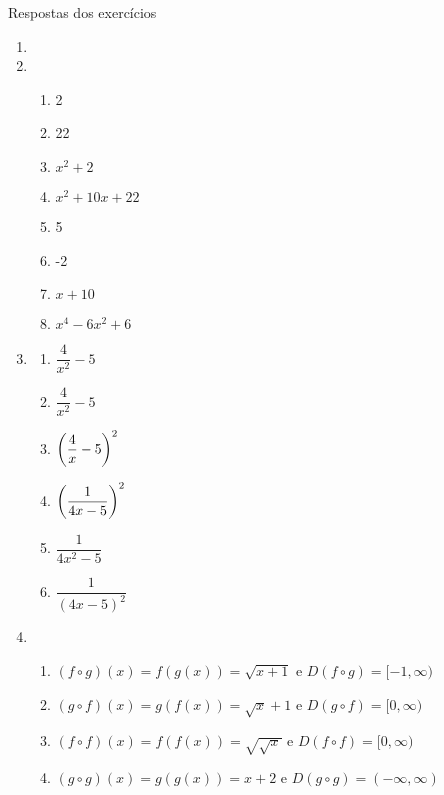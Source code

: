 \begin{frame}[allowframebreaks]{Respostas dos exercícios}
\begin{enumerate}
        \item

        \item 
        \begin{enumerate}[a]
            \item 2
            \item 22
            \item $x^2 + 2$
            \item $x^2 + 10x + 22$
            \item 5
            \item -2
            \item $x + 10$
            \item $x^4 - 6x^2 + 6$
        \end{enumerate}

        \item 
        \begin{multicols}{2}
            \begin{enumerate}[a]
                \item $\dfrac{4}{x^2} - 5$
                \item $\dfrac{4}{x^2} - 5$
                \item $\left( \dfrac{4}{x} - 5 \right)^2$
                \item $\left( \dfrac{1}{4x-5} \right)^2$
                \item $\dfrac{1}{4x^2 - 5}$
                \item $\dfrac{1}{(4x-5)^2}$
            \end{enumerate}
        \end{multicols}

        \skipframe

        \item
            \begin{enumerate}[a]
                \item $(f \circ g)(x) = f(g(x)) = \sqrt{x+1}$ e $D(f \circ g) = [-1, \infty)$
                \item $(g \circ f)(x) = g(f(x)) = \sqrt{x}+1$ e $D(g \circ f) = [0, \infty)$
                \item $(f \circ f)(x) = f(f(x)) = \sqrt{\sqrt{x}}$ e $D(f \circ f) = [0, \infty)$
                \item $(g \circ g)(x) = g(g(x)) = x+2$ e $D(g \circ g) = (-\infty, \infty)$
            \end{enumerate}


\end{enumerate}
\end{frame}
